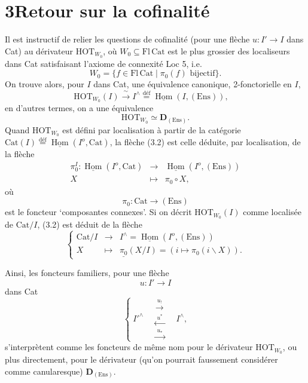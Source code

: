 \documentclass[11pt]{article}
\newcommand{\printedpage}[1]{\marginpar{\footnotesize p.~#1}}
\newcommand{\msp}[1]{\marginpar{\footnotesize [#1]}}
\newcommand{\HOT}{\mathrm{HOT}}
\newcommand{\Cat}{\mathrm{Cat}}
\newcommand{\Fl}{\mathrm{Fl}}
\newcommand{\Ens}{\mathrm{Ens}}
\newcommand{\defeq}{\overset{\text{déf}}{=}}
\newcommand{\uHom}{\underline{\operatorname{Hom}}}
\begin{document}
\printedpage{24}
\msp{page 37}

\section*{3\quad Retour sur la cofinalité}

Il est instructif de relier les questions de cofinalité (pour une flèche $u : I' \longrightarrow I$ dans Cat) au dérivateur $\HOT_{W_0}$, où $W_0 \subseteq \Fl\,\Cat$ est le plus grossier des localiseurs dans Cat satisfaisant l'axiome de connexité Loc 5, i.e.
\[
W_0 = \{ f \in \Fl\,\Cat \mid \pi_0(f) \text{ bijectif}\}. \tag*{(3.1)}
\]
On trouve alors, pour $I$ dans Cat, une équivalence canonique, 2-fonctorielle en $I$,
\[
\HOT_{W_0}(I) \xrightarrow{\;\sim\;} I^{\wedge} \defeq \uHom(I,(\Ens)), \quad \tag*{(3.2)}
\]
en d'autres termes, on a une équivalence
\[
\HOT_{W_0} \simeq \mathbf{D}_{(\Ens)}. \tag*{(3.3)}
\]
Quand $\HOT_{W_0}$ est défini par localisation à partir de la catégorie $\Cat(I) \defeq \uHom(I^o,\Cat)$, la flèche (3.2) est celle déduite, par localisation, de la flèche
\[
\begin{array}{rcl}
\pi_0^I : \uHom(I^o,\Cat) & \longrightarrow & \uHom(I^o,(\Ens)) \\[1ex]
X & \longmapsto & \pi_0 \circ X,
\end{array} \tag*{(3.4)}
\]
où
\[
\pi_0 : \Cat \longrightarrow (\Ens) \tag*{(3.5)}
\]
est le foncteur ‘composantes connexes’. Si on décrit $\HOT_{W_0}(I)$ comme localisée de $\Cat/I$, (3.2) est déduit de la flèche
\[
\left\{
\begin{array}{rcl}
\Cat/I & \longrightarrow & I^{\wedge} = \uHom(I^o,(\Ens)) \\[1ex]
X & \longmapsto & \underline{\pi_0}(X/I) = (i \longmapsto \pi_0(i\backslash X)).
\end{array}
\right. \tag*{(3.6)}
\]

\msp{page 38}
Ainsi, les foncteurs familiers, pour une flèche
\[
u : I' \longrightarrow I
\]
dans Cat
\[
\left\{
\; I'^{\wedge} \quad
\begin{array}{c}
\xrightarrow{\;u_!\;} \\[1.5ex]
\xleftarrow{\;u^*\;} \\[1.5ex]
\xrightarrow{\;u_*\;}
\end{array}
\quad I^{\wedge},
\right. \tag*{(3.7)}
\]
\printedpage{25}
s'interprètent comme les foncteurs de même nom pour le dérivateur $\HOT_{W_0}$, ou plus directement, pour le dérivateur (qu'on pourrait faussement considérer comme canularesque) $\mathbf{D}_{(\Ens)}$.
\end{document}
